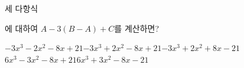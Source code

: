세 다항식\par\smallskip{}\par\smallskip\noindent 에 대하여 $A-3(B-A)+C$를 계산하면?
\begin{choicesii}{$-3x^3-2x^2-8x+21$}{$-3x^3+2x^2-8x+21$}{$-3x^3+2x^2+8x-21$}{$6x^3-3x^2-8x+21$}{$6x^3+3x^2-8x-21$}\end{choicesii}
